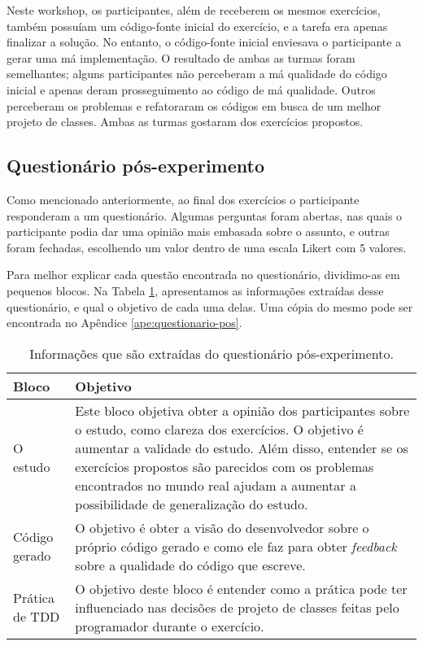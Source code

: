 Neste workshop, os participantes, além de receberem os mesmos
exercícios, também possuíam um código-fonte inicial do exercício, e a tarefa era
apenas finalizar a solução. No entanto, o código-fonte inicial enviesava o participante a gerar
uma má implementação. O resultado de ambas as turmas foram semelhantes; alguns participantes
não perceberam a má qualidade do código inicial e apenas deram prosseguimento ao código
de má qualidade. Outros perceberam os problemas e refatoraram os códigos em busca
de um melhor projeto de classes. Ambas as turmas gostaram dos exercícios
propostos.


\subsection{Questionário pós-experimento}
\label{sec:questionario}

Como mencionado anteriormente, ao final dos exercícios o participante responderam a um questionário.
Algumas perguntas foram abertas, nas quais o participante podia dar uma opinião mais embasada sobre o assunto,
e outras foram fechadas, escolhendo um valor dentro de uma escala
Likert com 5 valores.

Para melhor explicar cada questão encontrada no questionário, dividimo-as em pequenos blocos. 
Na Tabela \ref{tab:questionario-pos}, apresentamos
as informações extraídas desse questionário, e qual o objetivo de cada uma delas. Uma cópia
do mesmo pode ser encontrada no Apêndice \ref{ape:questionario-pos}.

\begin{table}
	\centering
	\begin{tabular}{ | p{5cm} | p{5cm} |}
		
		\hline
		
		Bloco & Objetivo \\
		
		\hline
		
		O estudo &
		Este bloco objetiva obter a opinião dos participantes sobre o estudo, como clareza dos
		exercícios. O objetivo é aumentar a validade do estudo.
		Além disso, entender se os exercícios propostos são parecidos com os problemas encontrados no mundo
		real ajudam a aumentar a possibilidade de generalização do estudo.
		\\ \hline
		
		Código gerado &
		O objetivo é obter a visão do desenvolvedor sobre o próprio código gerado e como ele
		faz para obter \textit{feedback} sobre a qualidade do código que escreve.
		\\ \hline
		
		Prática de TDD &
		O objetivo deste bloco é entender como a prática pode ter influenciado
		nas decisões de projeto de classes feitas pelo programador durante o exercício.\\
		
		\hline
		
	\end{tabular}
	\caption{Informações que são extraídas do questionário pós-experimento.}
	\label{tab:questionario-pos}
\end{table}

